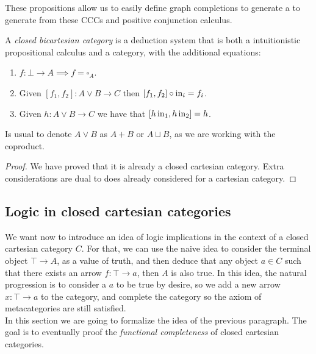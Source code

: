 These propositions allow us to easily define graph completions to generate a to generate from these CCCs and positive conjunction calculus.

\begin{proposition} A \emph{closed bicartesian category} is a deduction system that is both a intuitionistic propositional calculus and a category, with the additional equations:
  \begin{enumerate}
  \item $f:\bot \to A \implies f=\square_A$.
  \item Given $[f_1,f_2] : A\lor B \to C$ then $ [f_1,f_2]\circ \operatorname{in}_i  = f_i$.
  \item Given $h:A\lor B\to C$ we have that $[ h\operatorname{in}_1, h\operatorname{in}_2] = h$.
  \end{enumerate}
\end{proposition}
\begin{remark}
  Is usual to denote $A\lor B$ as $A+B$ or $A\sqcup B$, as we are working with the coproduct.
\end{remark} 
\begin{proof}
  We have proved that it is already a closed cartesian category. Extra considerations are dual to does already considered for a cartesian category.
\end{proof}
\subsection{Logic in closed cartesian categories}

We want now to introduce an idea of logic implications in the context of a closed cartesian category $C$. For that, we can use the naive idea to consider the terminal object $\top \to A$, as a value of truth, and then deduce that any object $a\in C$ such that there exists an arrow $f:\top \to a$, then $A$ is also true. In this idea, the natural progression is to consider a $a$ to be true by desire, so we add a new arrow $x:\top \to a$ to the category, and complete the category so the axiom of metacategories are still satisfied. \\

In this section we are going to formalize the idea of the previous paragraph. The goal is to eventually proof the \emph{functional completeness} of closed cartesian categories. 

